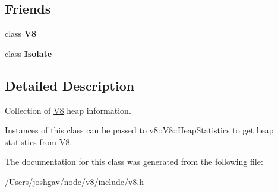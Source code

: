 \subsection*{Friends}
\begin{DoxyCompactItemize}
\item 
class {\bfseries V8}\hypertarget{classv8_1_1_heap_statistics_a51a1fbf409294cf02a99a020ac94a763}{}\label{classv8_1_1_heap_statistics_a51a1fbf409294cf02a99a020ac94a763}

\item 
class {\bfseries Isolate}\hypertarget{classv8_1_1_heap_statistics_aba4f0964bdacf2bbf62cf876e5d28d0a}{}\label{classv8_1_1_heap_statistics_aba4f0964bdacf2bbf62cf876e5d28d0a}

\end{DoxyCompactItemize}


\subsection{Detailed Description}
Collection of \hyperlink{classv8_1_1_v8}{V8} heap information.

Instances of this class can be passed to v8\+::\+V8\+::\+Heap\+Statistics to get heap statistics from \hyperlink{classv8_1_1_v8}{V8}. 

The documentation for this class was generated from the following file\+:\begin{DoxyCompactItemize}
\item 
/\+Users/joshgav/node/v8/include/v8.\+h\end{DoxyCompactItemize}
